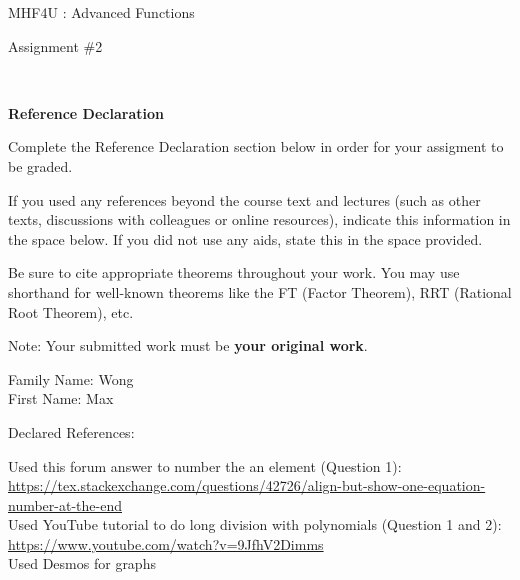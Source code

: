 \documentclass[12pt]{book}
\begin{document}
\vspace{-1.0in}\begin{center}
\Large{MHF4U : Advanced Functions }

\Large{Assignment \#2}


\end{center}


\vspace{0.015in}\hrulefill\ 

\textbf{Reference Declaration} %

Complete the Reference Declaration section below in order for your assigment to be graded.

If you used any references beyond the course text and lectures (such as other texts, discussions with colleagues or online resources), indicate this information in the space below.  If you did not use any aids, state this in the space provided. 

Be sure to cite appropriate theorems throughout your work. You may use shorthand for well-known theorems like the FT (Factor Theorem), RRT (Rational Root Theorem), etc. 

Note: Your submitted work must be \textbf{your original work}. 

Family Name: Wong\\%
First Name: Max%

Declared References: 

Used this forum answer to number the an element (Question 1): \\
\href{https://tex.stackexchange.com/questions/42726/align-but-show-one-equation-number-at-the-end}{https://tex.stackexchange.com/questions/42726/align-but-show-one-equation-number-at-the-end} \\
Used YouTube tutorial to do long division with polynomials (Question 1 and 2): \\
\href{https://www.youtube.com/watch?v=9JfhV2Dimms}{https://www.youtube.com/watch?v=9JfhV2Dimms} \\
Used Desmos for graphs


\vspace{0.015in}\hrulefill\ 

\newpage

\end{document}
